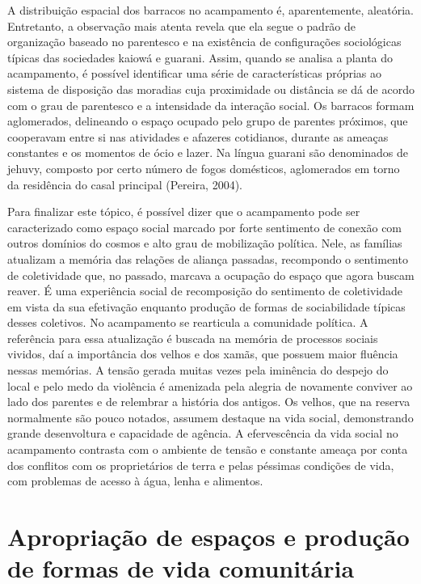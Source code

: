 {{A distribuição espacial dos barracos no acampamento é, aparentemente,
aleatória. Entretanto, a observação mais atenta revela que ela segue o
padrão de organização baseado no parentesco e na existência de
configurações sociológicas típicas das sociedades kaiowá e guarani.
Assim, quando se analisa a planta do acampamento, é possível
identificar uma série de características próprias ao sistema de
disposição das moradias cuja proximidade ou distância se dá de acordo
com o grau de parentesco e a intensidade da interação social. Os
barracos formam aglomerados, delineando o espaço ocupado pelo grupo de
parentes próximos, que cooperavam entre si nas atividades e afazeres
cotidianos, durante as ameaças constantes e os momentos de ócio e
lazer. Na língua guarani são denominados de jehuvy, composto por certo
número de fogos domésticos, aglomerados em torno da residência do casal
principal (Pereira, 2004).

Para finalizar este tópico, é possível dizer que o acampamento pode ser
caracterizado como espaço social marcado por forte sentimento de
conexão com outros domínios do cosmos e alto grau de mobilização
política. Nele, as famílias atualizam a memória das relações de aliança
passadas, recompondo o sentimento de coletividade que, no passado,
marcava a ocupação do espaço que agora buscam reaver. É uma experiência
social de recomposição do sentimento de coletividade em vista da sua
efetivação enquanto produção de formas de sociabilidade típicas desses
coletivos. No acampamento se rearticula a comunidade política. A
referência para essa atualização é buscada na memória de processos
sociais vividos, daí a importância dos velhos e dos xamãs, que possuem
maior fluência nessas memórias. A tensão gerada muitas vezes pela
iminência do despejo do local e pelo medo da violência é amenizada pela
alegria de novamente conviver ao lado dos parentes e de relembrar a
história dos antigos. Os velhos, que na reserva normalmente são pouco
notados, assumem destaque na vida social, demonstrando grande
desenvoltura e capacidade de agência. A efervescência da vida social no
acampamento contrasta com o ambiente de tensão e constante ameaça por
conta dos conflitos com os proprietários de terra e pelas péssimas
condições de vida, com problemas de acesso à água, lenha e alimentos. 

\section{Apropriação de espaços e produção de formas de vida comunitária}

}}
